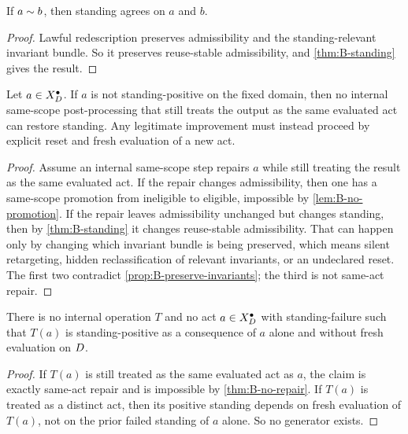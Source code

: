\begin{corollary}
If $a\sim b$, then standing agrees on $a$ and $b$.
\end{corollary}

\begin{proof}
Lawful redescription preserves admissibility and the standing-relevant invariant bundle. So it preserves reuse-stable admissibility, and \cref{thm:B-standing} gives the result.
\end{proof}

\begin{theorem}
\label{thm:B-no-repair}
Let $a\in X_D^{\bullet}$. If $a$ is not standing-positive on the fixed domain, then no internal same-scope post-processing that still treats the output as the same evaluated act can restore standing. Any legitimate improvement must instead proceed by explicit reset and fresh evaluation of a new act.
\end{theorem}

\begin{proof}
Assume an internal same-scope step repairs $a$ while still treating the result as the same evaluated act. If the repair changes admissibility, then one has a same-scope promotion from ineligible to eligible, impossible by \cref{lem:B-no-promotion}. If the repair leaves admissibility unchanged but changes standing, then by \cref{thm:B-standing} it changes reuse-stable admissibility. That can happen only by changing which invariant bundle is being preserved, which means silent retargeting, hidden reclassification of relevant invariants, or an undeclared reset. The first two contradict \cref{prop:B-preserve-invariants}; the third is not same-act repair.
\end{proof}

\begin{theorem}[No generators]
\label{thm:B-no-generators}
There is no internal operation $T$ and no act $a\in X_D^{\bullet}$ with standing-failure such that $T(a)$ is standing-positive as a consequence of $a$ alone and without fresh evaluation on $D$.
\end{theorem}

\begin{proof}
If $T(a)$ is still treated as the same evaluated act as $a$, the claim is exactly same-act repair and is impossible by \cref{thm:B-no-repair}. If $T(a)$ is treated as a distinct act, then its positive standing depends on fresh evaluation of $T(a)$, not on the prior failed standing of $a$ alone. So no generator exists.
\end{proof}

